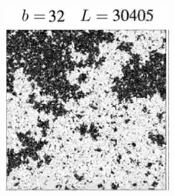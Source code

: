 \documentclass[]{article}
\begin{document}
\begin{figure}[H]
\begin{subfigure}[t]{0.3\textwidth}
	\end{subfigure}
	\begin{subfigure}[t]{0.3\textwidth}
		\includegraphics[width=\textwidth]{DouglasAshton3-3}
	\end{subfigure}
\end{figure}
\end{document}
